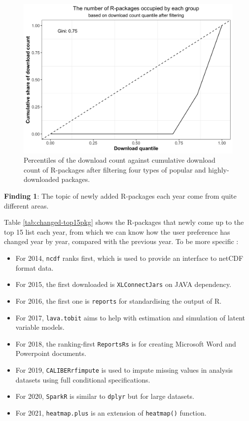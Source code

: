 \documentclass[
]{book}
\providecommand{\tightlist}{%
  \setlength{\itemsep}{0pt}\setlength{\parskip}{0pt}}
\newenvironment{discovery}[1]{%
  \begin{tcolorbox}[colback=blue!30,colframe=blue!80!black]#1}{\end{tcolorbox}}
\begin{document}
\begin{figure}

{\centering \includegraphics{figures/lorenz-filter-1} 

}

\caption{Percentiles of the download count against cumulative download count of R-packages after filtering four types of popular and highly-downloaded packages.}\label{fig:lorenz-filter}
\end{figure}

\begin{discovery}
\textbf{Finding 1}: The topic of newly added R-packages each year come
from quite different areas.
\end{discovery}

Table \ref{tab:changed-top15pkg} shows the R-packages that newly come up to the top 15 list each year, from which we can know how the user preference has changed year by year, compared with the previous year. To be more specific :

\begin{itemize}
\tightlist
\item
  For 2014, \texttt{ncdf} ranks first, which is used to provide an interface to netCDF format data.
\item
  For 2015, the first downloaded is \texttt{XLConnectJars} on JAVA dependency.
\item
  For 2016, the first one is \texttt{reports} for standardising the output of R.
\item
  For 2017, \texttt{lava.tobit} aims to help with estimation and simulation of latent variable models.
\item
  For 2018, the ranking-first \texttt{ReportsRs} is for creating Microsoft Word and Powerpoint documents.
\item
  For 2019, \texttt{CALIBERrfimpute} is used to impute missing values in analysis datasets using full conditional specifications.
\item
  For 2020, \texttt{SparkR} is similar to \texttt{dplyr} but for large datasets.
\item
  For 2021, \texttt{heatmap.plus} is an extension of \texttt{heatmap()} function.
\end{itemize}
\end{document}
